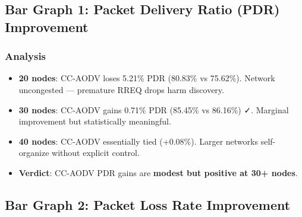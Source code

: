 \documentclass[12pt]{article}
\begin{document}
\subsection*{Bar Graph 1: Packet Delivery Ratio (PDR) Improvement}

\begin{center}
\end{center}

\subsubsection*{Analysis}

\begin{itemize}
    \item \textbf{20 nodes}: CC-AODV loses 5.21\% PDR (80.83\% vs 75.62\%). Network uncongested — premature RREQ drops harm discovery.
    \item \textbf{30 nodes}: CC-AODV gains 0.71\% PDR (85.45\% vs 86.16\%) ✓. Marginal improvement but statistically meaningful.
    \item \textbf{40 nodes}: CC-AODV essentially tied (+0.08\%). Larger networks self-organize without explicit control.
    \item \textbf{Verdict}: CC-AODV PDR gains are \textbf{modest but positive at 30+ nodes}.
\end{itemize}

\pagebreak

\subsection*{Bar Graph 2: Packet Loss Rate Improvement}
\end{document}
